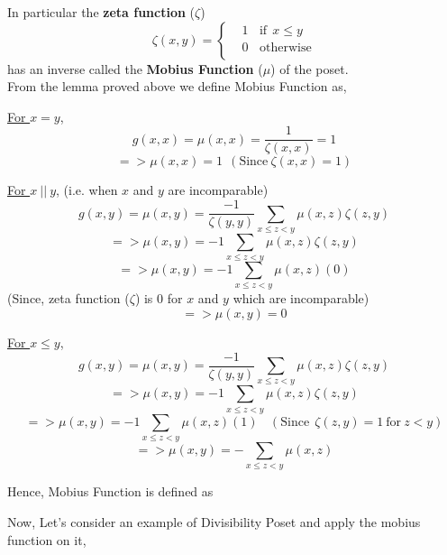 
\noindent In particular the \textbf{zeta function} ($\zeta$)
$$ \zeta (x, y) =  
\begin{cases}
&1 ~~~~\textrm{if} ~~x \le y \\
&0 ~~~~\textrm{otherwise} \\
\end{cases}
$$
has an inverse called the \textbf{Mobius Function} ($\mu$) of the poset.\\

\noindent From the lemma proved above we define Mobius Function as,

\noindent \underline{For $x = y$},
$$g(x,x) = \mu(x,x) = \frac{1}{\zeta (x,x)} = 1$$
$$=> \boxed{\mu(x,x) = 1 ~~ (\textrm{Since} ~\zeta (x,x) = 1)}$$

\noindent \underline{For $x ~ || ~ y$}, (i.e. when $x$ and $y$ are incomparable)
$$g(x,y) = \mu(x,y) = \frac{-1}{\zeta(y,y)}\sum_{x \le z < y} \mu(x,z) \zeta(z,y)$$
$$=> \mu(x,y) = -1\sum_{x \le z < y} \mu(x,z) \zeta(z,y) $$
$$=> \mu(x,y) = -1\sum_{x \le z < y} \mu(x,z) (0) $$
(Since, zeta function ($\zeta$) is $0$ for $x$ and $y$ which are incomparable)
$$=> \boxed{\mu(x,y) = 0}$$

\noindent \underline{For $x \le y$},
$$g(x,y) = \mu(x,y) = \frac{-1}{\zeta(y,y)}\sum_{x \le z < y} \mu(x,z) \zeta(z,y)$$
$$=> \mu(x,y) = -1\sum_{x \le z < y} \mu(x,z) \zeta(z,y) $$
$$=> \mu(x,y) = -1\sum_{x \le z < y} \mu(x,z) (1) ~~~~(\textrm{Since}~~ \zeta(z,y) = 1 ~ \textrm{for} ~z < y)$$
$$=> \boxed{\mu(x,y) = -\sum_{x \le z < y} \mu(x,z)}$$

Hence, Mobius Function is defined as

\begin{center}
\end{center}


\noindent Now, Let's consider an example of Divisibility Poset and apply the mobius function on it, 

